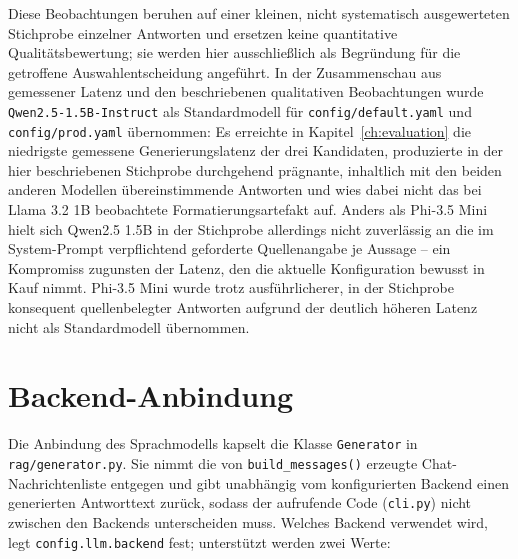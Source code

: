 Diese Beobachtungen beruhen auf einer kleinen, nicht systematisch ausgewerteten
Stichprobe einzelner Antworten und ersetzen keine quantitative Qualitätsbewertung;
sie werden hier ausschließlich als Begründung für die getroffene Auswahlentscheidung
angeführt. In der Zusammenschau aus gemessener Latenz und den beschriebenen
qualitativen Beobachtungen wurde \texttt{Qwen2.\allowbreak{}5-\allowbreak{}1.\allowbreak{}5B-\allowbreak{}Instruct} als Standardmodell für
\texttt{config/\allowbreak{}default.\allowbreak{}yaml} und \texttt{config/prod.yaml} übernommen: Es erreichte in
Kapitel~\ref{ch:evaluation} die niedrigste gemessene Generierungslatenz der drei
Kandidaten, produzierte in der hier beschriebenen Stichprobe durchgehend prägnante,
inhaltlich mit den beiden anderen Modellen übereinstimmende Antworten und wies dabei
nicht das bei Llama 3.2 1B beobachtete Formatierungsartefakt auf. Anders als Phi-3.5
Mini hielt sich Qwen2.5 1.5B in der Stichprobe allerdings nicht zuverlässig an die im
System-Prompt verpflichtend geforderte Quellenangabe je Aussage -- ein Kompromiss
zugunsten der Latenz, den die aktuelle Konfiguration bewusst in Kauf nimmt. Phi-3.5
Mini wurde trotz ausführlicherer, in der Stichprobe konsequent quellenbelegter
Antworten aufgrund der deutlich höheren Latenz nicht als Standardmodell übernommen.

\section{Backend-Anbindung}
\label{sec:backend-anbindung}

Die Anbindung des Sprachmodells kapselt die Klasse \texttt{Generator} in
\texttt{rag/generator.py}. Sie nimmt die von \texttt{build\_messages()} erzeugte
Chat-Nachrichtenliste entgegen und gibt unabhängig vom konfigurierten Backend einen
generierten Antworttext zurück, sodass der aufrufende Code (\texttt{cli.py}) nicht
zwischen den Backends unterscheiden muss. Welches Backend verwendet wird, legt
\texttt{config.llm.backend} fest; unterstützt werden zwei Werte:

